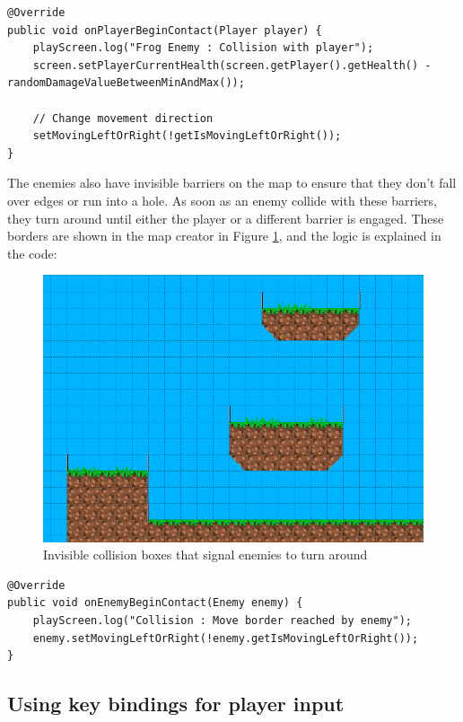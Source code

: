 \documentclass[12p]{article}
\begin{document}
\begin{verbatim}
@Override
public void onPlayerBeginContact(Player player) {
    playScreen.log("Frog Enemy : Collision with player");
    screen.setPlayerCurrentHealth(screen.getPlayer().getHealth() - randomDamageValueBetweenMinAndMax());

    // Change movement direction
    setMovingLeftOrRight(!getIsMovingLeftOrRight());
}
\end{verbatim}

The enemies also have invisible barriers on the map to ensure that they don’t fall over edges or run into a hole. As soon as an enemy collide with these barriers, they turn around until either the player or a different barrier is engaged. These borders are shown in the map creator in Figure \ref{fig:EnemyMoveBorders}, and the logic is explained in the code:

\begin{figure}[ht]
  \center
  \includegraphics[width=1\textwidth]{Documentation/enemyMoveBorders}
  \caption{Invisible collision boxes that signal enemies to turn around}
  \label{fig:EnemyMoveBorders}
\end{figure}

\begin{verbatim}
@Override
public void onEnemyBeginContact(Enemy enemy) {
    playScreen.log("Collision : Move border reached by enemy");
    enemy.setMovingLeftOrRight(!enemy.getIsMovingLeftOrRight());
}
\end{verbatim}


\subsection{Using key bindings for player input} \label{DocKeyBindings}
\end{document}
